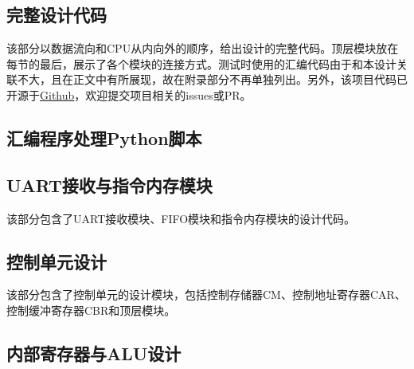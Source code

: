 \documentclass[lang=cn,a4paper,newtx]{elegantpaper}
\begin{document}
\begin{appendices}
  \section{完整设计代码}
  该部分以数据流向和CPU从内向外的顺序，给出设计的完整代码。顶层模块放在每节的最后，展示了各个模块的连接方式。测试时使用的汇编代码由于和本设计关联不大，且在正文中有所展现，故在附录部分不再单独列出。另外，该项目代码已开源于\href{https://github.com/LiPtP0000/CPU_Design}{Github}，欢迎提交项目相关的issues或PR。
  \subsection{汇编程序处理Python脚本}\label{sec:appendices:python}
  
  \subsection{UART接收与指令内存模块}\label{sec:appendices:uart}
  该部分包含了UART接收模块、FIFO模块和指令内存模块的设计代码。
  
  
  
  
  
  
  
  \subsection{控制单元设计}\label{sec:appendices:control}
  该部分包含了控制单元的设计模块，包括控制存储器CM、控制地址寄存器CAR、控制缓冲寄存器CBR和顶层模块。
  
  
  
  
  \subsection{内部寄存器与ALU设计}\label{sec:appendices:alu}
  
  
  
  
  
  
  

\end{appendices}
\end{document}
